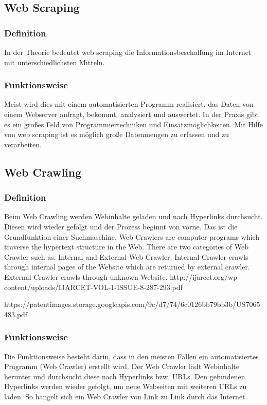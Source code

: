 	\subsection{Web Scraping}
		\subsubsection{Definition}
		In der Theorie bedeutet web scraping die Informationsbeschaffung im Internet mit unterschiedlichsten Mitteln. \cite{WebScraping}
		\subsubsection{Funktionsweise}
		Meist wird dies mit einem automatisierten Programm realisiert, das Daten von einem Webserver anfragt, bekommt, analysiert und auswertet. 
		In der Praxis gibt es ein großes Feld von Programmiertechniken und Einsatzmöglichkeiten.
		Mit Hilfe von web scraping ist es möglich große Datenmengen zu erfassen und zu verarbeiten.\cite{WebScraping}

	\subsection{Web Crawling}
		\subsubsection{Definition}
		Beim Web Crawling werden Webinhalte geladen und nach Hyperlinks durchsucht. Diesen wird wieder gefolgt und der Prozess beginnt von vorne. Das ist die Grundfunktion einer Suchmaschine.\cite{WebScraping}
		Web  Crawlers  are  computer  programs  which  traverse  the 
		hypertext structure in the Web. There  are  two  categories  of 
		Web  Crawler  such  as:  Internal  and  External  Web  Crawler. 
		Internal   Crawler   crawls   through   internal   pages   of   the 
		Website  which  are  returned  by  external  crawler.  External 
		Crawler crawls through unknown Website. http://ijarcet.org/wp-content/uploads/IJARCET-VOL-1-ISSUE-8-287-293.pdf
		
		https://patentimages.storage.googleapis.com/9c/d7/74/6c0126bb79bb3b/US7065483.pdf
		\subsubsection{Funktionsweise}
		Die Funktionsweise besteht darin, dass in den meisten Fällen ein automatisiertes Programm (Web Crawler) erstellt wird. Der Web Crawler lädt Webinhalte herunter und durchsucht diese nach Hyperlinks bzw. URLs. Den gefundenen Hyperlinks werden wieder gefolgt, um neue Webseiten mit weiteren URLs zu laden. So hangelt sich ein Web Crawler von Link zu Link durch das Internet.\cite{WebScraping}


